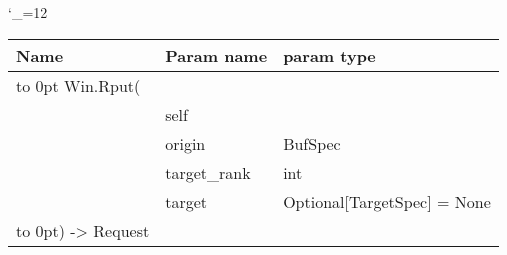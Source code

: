 \begingroup \catcode`\_=12 \tt
\begin{tabular}{lll}
\toprule
\textrm{Name}&\textrm{Param name}&\textrm{param type}\\
\midrule
\hbox to 0pt {Win.Rput(\hss}\\
& self\\
& origin & BufSpec\\
& target_rank & int\\
& target & Optional[TargetSpec] = None\\
\hbox to 0pt{) -> Request\hss}\\
\bottomrule
\end{tabular}
\endgroup
